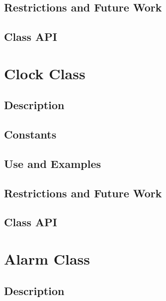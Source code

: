 \documentclass[english]{article}
\begin{document}
\subsection{Restrictions and Future Work}

\subsection{Class API}
%
%
%
%
%

\newpage
\section{Clock Class}
\subsection{Description}

\subsection{Constants}

\subsection{Use and Examples}


\subsection{Restrictions and Future Work}

\subsection{Class API}

\newpage
\section{Alarm Class}
\subsection{Description}

\end{document}
